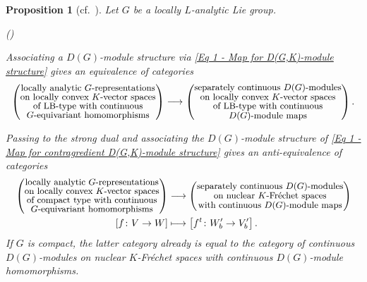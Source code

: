 \documentclass[a4paper, reqno, 10pt]{amsart}
\newtheorem{proposition}[theorem]{Proposition}
\theoremstyle{definition}
\newenvironment{altenumerate}
	{\begin{list}
		{\textup{(\theenumi)} }
		{\usecounter{enumi}
			\setlength{\labelwidth}{0pt}
			\setlength{\labelsep}{0pt}
			\setlength{\leftmargin}{0pt}
			\setlength{\itemsep}{0pt}
			\setlength{\topsep}{0pt}
		\renewcommand{\theenumi}{\roman{enumi}}
		}}
	{\end{list}}
\numberwithin{equation}{section}
\newcommand{\lra}{\longrightarrow}
\newcommand{\lto}{\longmapsto}
\newcommand{\ra}{\rightarrow}
\begin{document}
\begin{proposition}[{cf.\ \cite[\S 3]{SchneiderTeitelbaum02LocAnDistApplToGL2}}]\label{Prop 1 - Equivalences for categories of locally analytic representations}
	Let $G$ be a locally $L$-analytic Lie group.
	\begin{altenumerate}
		\item
		Associating a $D(G)$-module structure via \eqref{Eq 1 - Map for D(G,K)-module structure} gives an equivalence of categories
		\begin{equation}\label{Eq 1 - Equivalence of categories between representations and modules over the distribution algebra}
			\left(\substack{\text{\small locally analytic $G$-representations} \\ \text{\small on locally convex $K$-vector spaces} \\ \text{\small of LB-type with continuous} \\ \text{\small  $G$-equivariant homomorphisms}}\right) \lra 
			\left(\substack{\text{\small separately continuous $D(G)$-modules} \\ \text{\small on locally convex $K$-vector spaces} \\ \text{\small of LB-type with continuous} \\ \text{\small $D(G)$-module maps}}\right).
		\end{equation}
		\item
		Passing to the strong dual and associating the $D(G)$-module structure of \eqref{Eq 1 - Map for contragredient D(G,K)-module structure} gives an anti-equivalence of categories
		\begin{align}\label{Eq 1 - Antiequivalence between locally analytic representations and modules over the distribution algebra}
			\begin{split}
				\left(\substack{\text{\small locally analytic $G$-representations} \\ \text{\small on locally convex $K$-vector spaces}\\ \text{\small of compact type with continuous} \\ \text{\small $G$-equivariant homomorphisms}}\right) &\lra \left(\substack{\text{\small separately continuous $D(G)$-modules} \\ \text{\small on nuclear $K$-Fr\'echet spaces} \\ \text{\small with continuous $D(G)$-module maps}}\right) \\
				\left[f\colon V \ra W \right] &\lto \left[f^t \colon W'_b \ra V'_b \right] . 
			\end{split}
		\end{align}
		If $G$ is compact, the latter category already is equal to the category of continuous $D(G)$-modules on nuclear $K$-Fr\'echet spaces with continuous $D(G)$-module homomorphisms.
	\end{altenumerate}
\end{proposition}
\end{document}
